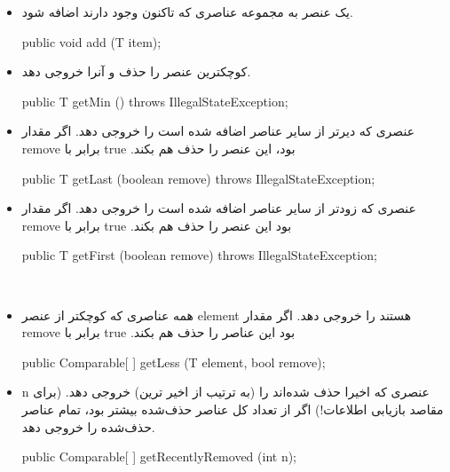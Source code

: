 \documentclass[]{article}
\begin{document}
\begin{itemize}
\item یک عنصر به مجموعه عناصری که تاکنون وجود دارند اضافه شود.
\begin{tcolorbox}[boxrule=0pt]
	\begin{latin}
  	  \large{
  	  	public void add (T item);
		}
	\end{latin}
\end{tcolorbox}
\item کوچکترین عنصر را حذف و آنرا خروجی دهد.
\begin{tcolorbox}[boxrule=0pt]
	\begin{latin}
  	  \large{
  	  	public T getMin () throws IllegalStateException;
		}
	\end{latin}
\end{tcolorbox}
\item عنصری که دیرتر از سایر عناصر اضافه شده است را خروجی دهد. اگر مقدار remove برابر با true بود، این عنصر را حذف هم بکند‫.‬
\begin{tcolorbox}[boxrule=0pt]
	\begin{latin}
  	  \large{
  	  	public T getLast (boolean remove) throws IllegalStateException;
		}
	\end{latin}
\end{tcolorbox}
\item عنصری که زودتر از سایر عناصر اضافه شده است را خروجی دهد. اگر مقدار remove برابر با true بود این عنصر را حذف هم بکند‫.
\begin{tcolorbox}[boxrule=0pt]
	\begin{latin}
  	  \large{
  	  	public T getFirst (boolean remove) throws IllegalStateException;
		}
	\end{latin}
\end{tcolorbox}‬
\item همه عناصری که کوچکتر از عنصر element هستند را خروجی دهد. اگر مقدار remove برابر با true بود این عناصر را حذف هم بکند‫.‬
\begin{tcolorbox}[boxrule=0pt]
	\begin{latin}
  	  \large{
  	  	public Comparable[ ] getLess (T element, bool remove);
		}
	\end{latin}
\end{tcolorbox}
\item ‌n عنصری که اخیرا حذف شده‌اند را (به ترتیب از اخیر ترین) خروجی دهد. (برای مقاصد بازیابی اطلاعات!) اگر  از تعداد کل عناصر حذف‌شده بیشتر بود، تمام عناصر حذف‌شده را خروجی دهد.
\begin{tcolorbox}[boxrule=0pt]
	\begin{latin}
  	  \large{
  	  	public Comparable[ ] getRecentlyRemoved (int n);
		}
	\end{latin}
\end{tcolorbox}
\end{itemize}
\end{document}
